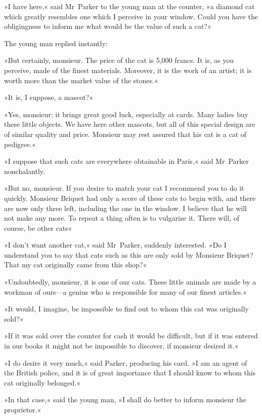 »I have here,« said Mr~Parker to the young man at the counter, »a diamond cat which greatly resembles one which I perceive in your window. Could you have the obligingness to inform me what would be the value of such a cat?«

The young man replied instantly:

»But certainly, monsieur. The price of the cat is 5,000 francs. It is, as you perceive, made of the finest materials. Moreover, it is the work of an artist; it is worth more than the market value of the stones.«

»It is, I suppose, a mascot?«

»Yes, monsieur; it brings great good luck, especially at cards. Many ladies buy these little objects. We have here other mascots, but all of this special design are of similar quality and price. Monsieur may rest assured that his cat is a cat of pedigree.«

»I suppose that such cats are everywhere obtainable in Paris,« said Mr~Parker nonchalantly.

»But no, monsieur. If you desire to match your cat I recommend you to do it quickly. Monsieur Briquet had only a score of these cats to begin with, and there are now only three left, including the one in the window. I believe that he will not make any more. To repeat a thing often is to vulgarize it. There will, of course, be other cats\longdash«

»I don't want another cat,« said Mr~Parker, suddenly interested. »Do I understand you to say that cats such as this are only sold by Monsieur Briquet? That my cat originally came from this shop?«

»Undoubtedly, monsieur, it is one of our cats. These little animals are made by a workman of ours—a genius who is responsible for many of our finest articles.«

»It would, I imagine, be impossible to find out to whom this cat was originally sold?«

»If it was sold over the counter for cash it would be difficult, but if it was entered in our books it might not be impossible to discover, if monsieur desired it.«

»I do desire it very much,« said Parker, producing his card. »I am an agent of the British police, and it is of great importance that I should know to whom this cat originally belonged.«

»In that case,« said the young man, »I shall do better to inform monsieur the proprietor.«

